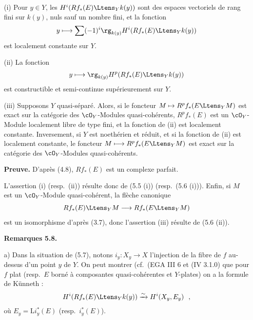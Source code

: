 \medskip

(i) Pour $y \in Y$, les $H^i(Rf_*(E) \Ltens_Y k(y))$ sont des espaces vectoriels de rang fini sur $k(y)$, nuls sauf un nombre fini, et la fonction
\[
y \longmapsto \sum (-1)^i \rg_{k(y)} H^i(Rf_*(E) \Ltens_Y k(y))
\]
est localement constante sur $Y$.

\smallskip

(ii) La fonction
\[
y \longmapsto \rg_{k(y)} H^p(Rf_*(E) \Ltens_Y k(y))
\]
est constructible et semi-continue sup\'{e}rieurement sur $Y$.

\smallskip

(iii) Supposons $Y$ quasi-s\'{e}par\'{e}. Alors, si le foncteur $M \mapsto R^pf_*(E \Ltens_Y M)$ est exact sur la cat\'{e}gorie des $\cO_Y$-Modules quasi-coh\'{e}rents, $R^pf_*(E)$ est un $\cO_Y$-Module localement libre de type fini, et la fonction de (ii) est localement constante. Inversement, si $Y$ est noeth\'{e}rien et r\'{e}duit, et si la fonction de (ii) est localement constante, le foncteur $M \longmapsto R^pf_*(E \Ltens_Y M)$ est exact sur la cat\'{e}gorie des $\cO_Y$-Modules quasi-coh\'{e}rents.

\medskip

\noindent\textbf{Preuve.} D'apr\`{e}s (4.8), $Rf_*(E)$ est un complexe parfait.

L'assertion (i) (resp.\ (ii)) r\'{e}sulte donc de (5.5 (i)) (resp.\ (5.6 (i))). Enfin, si $M$ est un $\cO_Y$-Module quasi-coh\'{e}rent, la fl\`{e}che canonique
\[
Rf_*(E) \Ltens_Y M \longrightarrow Rf_*(E \Ltens_Y M)
\]
est un isomorphisme d'apr\`{e}s (3.7), donc l'assertion (iii) r\'{e}sulte de (5.6 (ii)).

\medskip

\noindent\textbf{Remarques 5.8.}

\medskip

a) Dans la situation de (5.7), notons $i_y : X_y \longrightarrow X$ l'injection de la fibre de $f$ au-dessus d'un point $y$ de $Y$. On peut montrer (cf.\ (EGA III 6 et (IV 3.1.0) que pour $f$ plat (resp.\ $E$ born\'{e} \`{a} composantes quasi-coh\'{e}rentes et $Y$-plates) on a la formule de K\"{u}nneth :
\[
H^i(Rf_*(E) \Ltens_Y k(y)) \xrightarrow{\sim} H^i(X_y, E_y)\ \ ,
\]
o\`{u} $E_y = \mathrm{L}i_y^*(E)$ (resp.\ $i_y^*(E)$).

\smallskip

